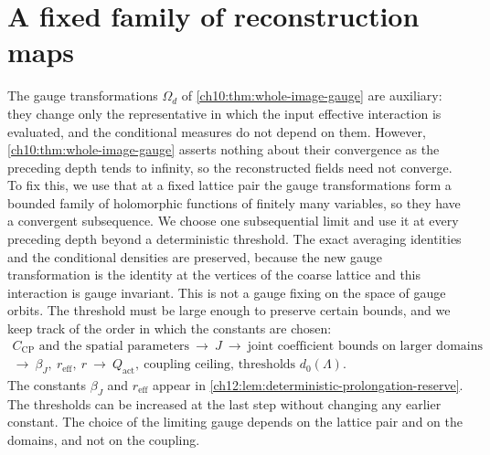 \section{A fixed family of reconstruction maps}\label{ch12:sec:family}

The gauge transformations $\Omega_d$ of \cref{ch10:thm:whole-image-gauge} are auxiliary: they change only the representative in which the input effective interaction is evaluated, and the conditional measures do not depend on them. However, \cref{ch10:thm:whole-image-gauge} asserts nothing about their convergence as the preceding depth tends to infinity, so the reconstructed fields need not converge. To fix this, we use that at a fixed lattice pair the gauge transformations form a bounded family of holomorphic functions of finitely many variables, so they have a convergent subsequence. We choose one subsequential limit and use it at every preceding depth beyond a deterministic threshold. The exact averaging identities and the conditional densities are preserved, because the new gauge transformation is the identity at the vertices of the coarse lattice and this interaction is gauge invariant. This is not a gauge fixing on the space of gauge orbits. The threshold must be large enough to preserve certain bounds, and we keep track of the order in which the constants are chosen:
\begin{equation}\label{ch12:eq:order-of-choices}
 \begin{gathered}
 \text{$C_{\mathrm{CP}}$ and the spatial parameters}\ \longrightarrow\ J\ \longrightarrow\ \text{joint coefficient bounds on larger domains}\\
 \longrightarrow\ \beta_J,\ r_{\mathrm{eff}},\ r\ \longrightarrow\ Q_{\mathrm{act}},\ \text{coupling ceiling, thresholds }d_0(\Lambda).
 \end{gathered}
\end{equation}
The constants $\beta_J$ and $r_{\mathrm{eff}}$ appear in \cref{ch12:lem:deterministic-prolongation-reserve}. The thresholds can be increased at the last step without changing any earlier constant. The choice of the limiting gauge depends on the lattice pair and on the domains, and not on the coupling.

